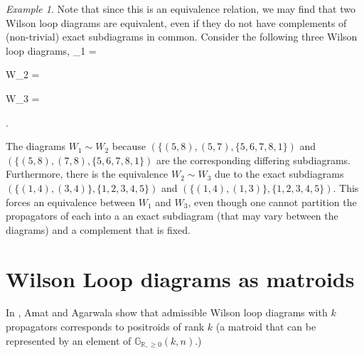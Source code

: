 \documentclass[11pt]{article}
\newcommand{\drawWLD}[2]{

\pgfmathsetmacro{\n}{#1}
\pgfmathsetmacro{\radius}{#2}
\pgfmathsetmacro{\angle}{360/\n}
    \foreach \i in {1,2,...,\n} {
      \pgfmathsetmacro{\x}{\angle*\i}
        \draw[-,shorten >=-\radius*0.1 cm,shorten <=-\radius*0.1 cm]  (\x:\radius cm)-- (\x + \angle: \radius cm);
    }

\draw (\angle:\radius) node {$\bullet$};
}
\newcommand{\drawprop}[4]{
\pgfmathsetmacro{\r}{#1}
\pgfmathsetmacro{\bumpr}{#2}
\pgfmathsetmacro{\s}{#3}
\pgfmathsetmacro{\bumps}{#4}
\pgfmathsetmacro{\perturbe}{\angle/\n}

\begin{scope}
\clip (\angle*\r:\radius) -- (\angle + \angle*\r:\radius) -- (\angle*\s:\radius) -- (\angle + \angle*\s:\radius) -- (\angle*\r:\radius);
\draw[propagator] (\angle*\r + \angle/2 + \bumpr*\perturbe:\radius) -- (\angle*\s + \angle/2 + \bumps*\perturbe:\radius);
\end{scope}
}
\newcommand{\drawnumbers}{
  \foreach \i in {1,2,...,\n} {
  \pgfmathsetmacro{\x}{\angle*\i}
  \draw (\x:\radius*1.15) node {\footnotesize \i};
}
}
\newcommand{\R}{\mathbb{R}}
\newcommand{\Gr}{\mathbb{G}_{\R, \geq 0}}
\def\bas #1\eas{\begin{align*} #1 \end{align*}}
\theoremstyle{remark}
\newtheorem{eg}[thm]{Example}
\theoremstyle{definition}
\begin{document}
\begin{eg}
Note that since this is an equivalence relation, we may find that two Wilson loop diagrams are equivalent, even if they do not have complements of (non-trivial) exact subdiagrams in common. Consider the following three Wilson loop diagrams,
\bas
W_1 =  \quad
W_2 =  \quad
W_3 =  .
\eas

The diagrams $W_1 \sim W_2$ because $(\{(5,8), (5,7), \{5,6,7,8,1\})$ and $(\{(5,8), (7,8), \{5,6,7,8,1\})$ are the corresponding differing subdiagrams. Furthermore, there is the equivalence $W_2 \sim W_3$ due to the exact subdiagrams $(\{(1,4), (3,4)\}, \{1,2,3,4,5\})$ and $(\{(1,4), (1,3)\}, \{1,2,3,4,5\})$. This forces an equivalence between $W_1$ and $W_3$, even though one cannot partition the propagators of each into a an exact subdiagram (that may vary between the diagrams) and a complement that is fixed.  \end{eg} 

\section{Wilson Loop diagrams as matroids}

In \cite{wilsonloop}, Amat and Agarwala show that admissible Wilson loop diagrams with $k$ propagators corresponds to positroids of rank $k$ (a matroid that can be represented by an element of $\Gr(k, n)$.)
\end{document}
